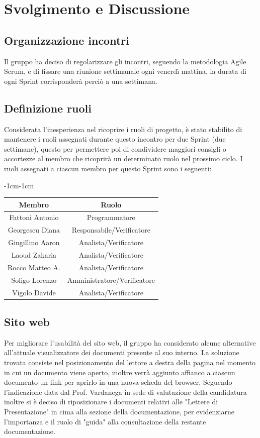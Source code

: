 \documentclass[a4paper,12pt]{article}
\begin{document}
\section{Svolgimento e Discussione}

\subsection{Organizzazione incontri}
Il gruppo ha deciso di regolarizzare gli incontri, seguendo la metodologia Agile Scrum, e di fissare una riunione settimanale 
ogni venerdì mattina, la durata di ogni Sprint corrisponderà perciò a una settimana.

\subsection{Definizione ruoli}
Considerata l'inesperienza nel ricoprire i ruoli di progetto, è stato stabilito di mantenere i ruoli assegnati durante questo incontro per due Sprint (due settimane), questo per permettere poi di condividere maggiori consigli o accortezze al membro che ricoprirà un determinato ruolo nel prossimo ciclo.
I ruoli assegnati a ciascun membro per questo Sprint sono i seguenti:
\begin{table}[H]
    \begin{adjustwidth}{-1cm}{-1cm}
    \centering
\begin{tabular}{|c|c|}
    \hline
    \textbf{Membro} & \textbf{Ruolo} \\
    \hline
    Fattoni Antonio & Programmatore \\
    \hline
    Georgescu Diana & Responsabile/Verificatore \\
    \hline
    Gingillino Aaron & Analista/Verificatore \\
    \hline
    Laoud Zakaria & Analista/Verificatore \\
    \hline
    Rocco Matteo A. & Analista/Verificatore \\
    \hline
    Soligo Lorenzo & Amministratore/Verificatore \\
    \hline
    Vigolo Davide & Analista/Verificatore \\
    \hline
\end{tabular}
    \end{adjustwidth}
\end{table}

\subsection{Sito web}
Per migliorare l'usabilità del sito web, il gruppo ha considerato alcune alternative all'attuale visualizzatore dei documenti presente
al suo interno. La soluzione trovata consiste nel posizionamento del lettore a destra della pagina nel momento in cui un documento viene
aperto, inoltre verrà aggiunto affianco a ciascun documento un link per aprirlo in una nuova scheda del browser.
Seguendo l'indicazione data dal Prof. Vardanega in sede di valutazione della candidatura inoltre si è deciso di riposizionare i documenti
relativi alle "Lettere di Presentazione" in cima alla sezione della documentazione, per evidenziarne l'importanza e il ruolo di
"guida" alla consultazione della restante documentazione.
\end{document}
